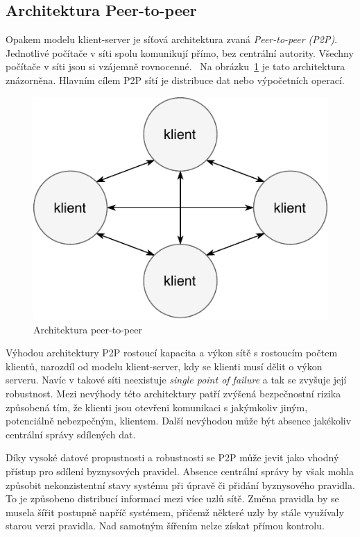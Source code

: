 \subsection{Architektura Peer-to-peer}\label{sec:p2p}

Opakem modelu klient-server je síťová architektura zvaná \textit{Peer-to-peer (\gls{P2P})}.
Jednotlivé počítače v síti spolu komunikují přímo, bez centrální autority.
Všechny počítače v síti jsou si vzájemně rovnocenné.~\cite{fox2001peer}
Na obrázku~\ref{fig:peer-to-peer} je tato architektura znázorněna.
Hlavním cílem \gls{P2P} sítí je distribuce dat nebo výpočetních operací.

\begin{figure}[t]
    \centering
    \includegraphics[keepaspectratio=true, width=0.4\linewidth]{figures/peer-to-peer.pdf}
    \caption{Architektura peer-to-peer}
    \label{fig:peer-to-peer}
\end{figure}


Výhodou architektury \gls{P2P} rostoucí kapacita a výkon sítě s rostoucím počtem klientů,
narozdíl od modelu klient-server, kdy se klienti musí dělit o výkon serveru.
Navíc v takové síti neexistuje \textit{single point of failure} a tak se zvyšuje její robustnost.
Mezi nevýhody této architektury patří zvýšená bezpečnostní rizika způsobená tím,
že klienti jsou otevřeni komunikaci s jakýmkoliv jiným, potenciálně nebezpečným, klientem.
Další nevýhodou může být absence jakékoliv centrální správy sdílených dat.

Díky vysoké datové propustnosti a robustnosti se \gls{P2P} může jevit jako vhodný přístup pro
sdílení byznysových pravidel. Absence centrální správy by však mohla způsobit nekonzistentní stavy
systému při úpravě či přidání byznysového pravidla. To je způsobeno distribucí informací mezi více uzlů sítě.
Změna pravidla by se musela šířit postupně napříč systémem, přičemž některé uzly by stále využívaly starou
verzi pravidla. Nad samotným šířením nelze získat přímou kontrolu.

